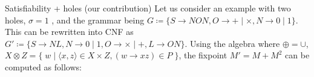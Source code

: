 \documentclass{beamer}
\newcommand\hole{\underline{\hspace{0.25cm}}}
\begin{document}
\begin{frame}[fragile]{Satisfiability + holes (our contribution)}
  Let us consider an example with two holes, $\sigma = 1$ \hole\phantom{.}\hole, and the grammar being $G\coloneqq\{S\rightarrow N O N, O \rightarrow + \mid \times, N \rightarrow 0 \mid 1\}$. This can be rewritten into CNF as $G'\coloneqq \{S \rightarrow N L, N \rightarrow 0 \mid 1, O \rightarrow × \mid +, L \rightarrow O N\}$. Using the algebra where $\oplus=\cup$, $X \otimes Z = \big\{\;w \mid \langle x, z\rangle \in X \times Z, (w\rightarrow xz) \in P\;\big\}$, the fixpoint $M' = M + M^2$ can be computed as follows:\\\vspace{10pt}

\end{frame}
\end{document}
